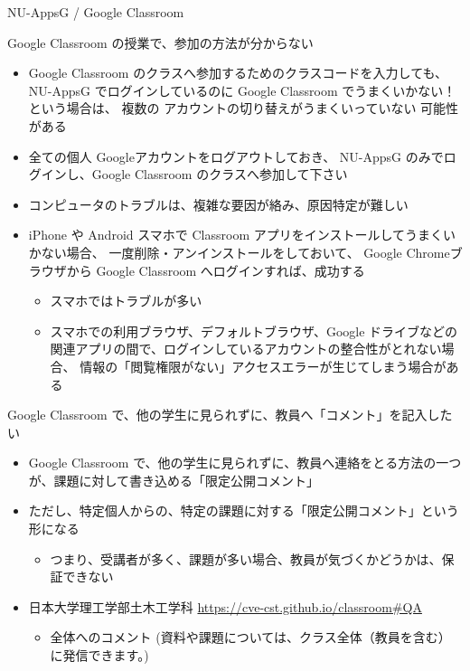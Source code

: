 \documentclass[a4j,10pt]{jsarticle}
\begin{document}
{\begin{frame}[label={sec:orgbe869cf},fragile]{NU-AppsG / Google Classroom}
\begin{block}{Google Classroom の授業で、参加の方法が分からない}
\begin{itemize}
\par
\item Google Classroom のクラスへ参加するためのクラスコードを入力しても、
NU-AppsG でログインしているのに Google Classroom でうまくいかない！という場合は、
複数の \alert{アカウントの切り替えがうまくいっていない} 可能性がある
\par
\item 全ての個人 Googleアカウントをログアウトしておき、
NU-AppsG のみでログインし、Google Classroom のクラスへ参加して下さい
\par
\item コンピュータのトラブルは、複雑な要因が絡み、原因特定が難しい
\par
\item iPhone や Android スマホで Classroom アプリをインストールしてうまくいかない場合、
一度削除・アンインストールをしておいて、
Google Chromeブラウザから Google Classroom へログインすれば、成功する
\begin{itemize}
\item スマホではトラブルが多い
\item スマホでの利用ブラウザ、デフォルトブラウザ、Google ドライブなどの関連アプリの間で、ログインしているアカウントの整合性がとれない場合、
情報の「閲覧権限がない」アクセスエラーが生じてしまう場合がある
\end{itemize}
\end{itemize}
\end{block}
\par
\begin{block}{Google Classroom で、他の学生に見られずに、教員へ「コメント」を記入したい}
\begin{itemize}
\item Google Classroom で、他の学生に見られずに、教員へ連絡をとる方法の一つが、課題に対して書き込める「限定公開コメント」
\par
\item ただし、特定個人からの、特定の課題に対する「限定公開コメント」という形になる
\begin{itemize}
\item つまり、受講者が多く、課題が多い場合、教員が気づくかどうかは、保証できない
\end{itemize}
\par
\item 日本大学理工学部土木工学科 \url{https://cve-cst.github.io/classroom\#QA}
\begin{itemize}
\item 全体へのコメント (資料や課題については、クラス全体（教員を含む）に発信できます。)

\end{itemize}
\end{itemize}
\end{block}
\end{frame}}
\end{document}
